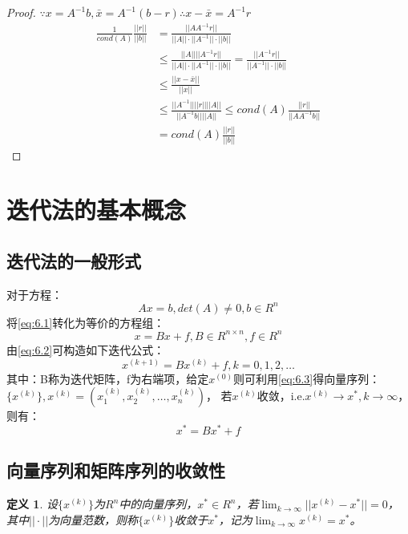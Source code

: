 \documentclass[a4paper]{article}
\newtheorem{definition}{定义}[section]
\begin{document}
\begin{proof}
  $\because x=A^{-1}b, \bar{x}=A^{-1}(b-r) \therefore x-\bar{x}=A^{-1}r $\\
  \begin{equation*}
    \begin{split}
      \frac{1}{cond(A)}\frac{||r||}{||b||} &= \frac{||AA^{-1}r||}{||A||\cdot||A^{-1}||\cdot||b||} \\
      &\le \frac{||A||||A^{-1}r||}{||A||\cdot||A^{-1}||\cdot||b||} = \frac{||A^{-1}r||}{||A^{-1}||\cdot||b||} \\
      &\le \frac{||x-\bar{x}||}{||x||} \\
      &\le \frac{||A^{-1}||||r||||A||}{||A^{-1}b||||A||} \le cond(A)\frac{||r||}{||AA^{-1}b||} \\
      &= cond(A)\frac{||r||}{||b||}
    \end{split}
  \end{equation*}
\end{proof}

\section{迭代法的基本概念}
\subsection{迭代法的一般形式}
对于方程：
\begin{equation}
  Ax=b, det(A)\neq 0, b\in R^n
  \label{eq:6.1}
\end{equation}
将\ref{eq:6.1}转化为等价的方程组：
\begin{equation}
  x= Bx+f, B\in R^{n\times n}, f\in R^n
  \label{eq:6.2}
\end{equation}
由\ref{eq:6.2}可构造如下迭代公式：
\begin{equation}
  x^{(k+1)}=Bx^{(k)}+f, k=0,1,2,\dots
  \label{eq:6.3}
\end{equation}
其中：B称为迭代矩阵，f为右端项，给定$x^{(0)}$则可利用\ref{eq:6.3}得向量序列：$\{x^{(k)}\},x^{(k)}=(x_1^{(k)}, x_2^{(k)}, \dots, x_n^{(k)}) $，
若$x^{(k)}$收敛，i.e.$x^{(k)}\rightarrow x^*, k\rightarrow \infty$，则有：
$$x^*=Bx^*+f $$

\subsection{向量序列和矩阵序列的收敛性}
\begin{definition}
  设$\{x^{(k)}\}$为$R^n$中的向量序列，$x^*\in R^n$，若$\lim_{k\rightarrow \infty}||x^{(k)} - x^*||=0 $，
  其中$||\cdot||$为向量范数，则称$\{x^{(k)}\}$收敛于$x^*$，记为$\lim_{k\rightarrow \infty}x^{(k)} = x^* $。
\end{definition}
\end{document}
